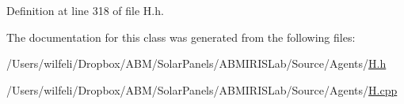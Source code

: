 Definition at line 318 of file H.\+h.



The documentation for this class was generated from the following files\+:\begin{DoxyCompactItemize}
\item 
/\+Users/wilfeli/\+Dropbox/\+A\+B\+M/\+Solar\+Panels/\+A\+B\+M\+I\+R\+I\+S\+Lab/\+Source/\+Agents/\hyperlink{_h_8h}{H.\+h}\item 
/\+Users/wilfeli/\+Dropbox/\+A\+B\+M/\+Solar\+Panels/\+A\+B\+M\+I\+R\+I\+S\+Lab/\+Source/\+Agents/\hyperlink{_h_8cpp}{H.\+cpp}\end{DoxyCompactItemize}
